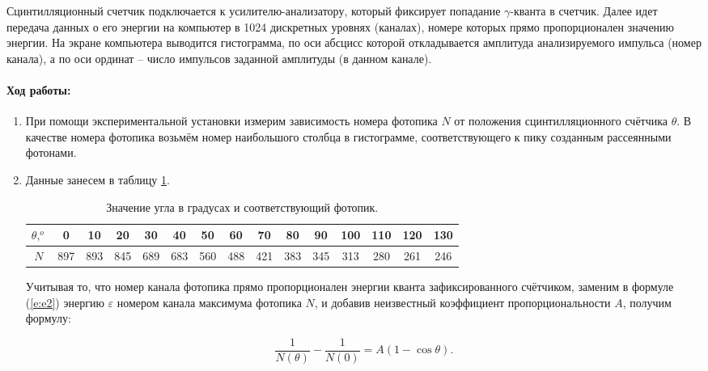 \documentclass[a4paper,12pt]{article}
\begin{document}
Сцинтилляционный счетчик подключается к усилителю-анализатору, который фиксирует попадание $\gamma$-кванта в счетчик. Далее идет передача данных о его энергии на компьютер в 1024 дискретных уровнях (каналах), номере которых прямо пропорционален значению энергии. На экране компьютера выводится гистограмма, по оси абсцисс которой откладывается амплитуда анализируемого импульса (номер канала), а по оси ординат -- число импульсов заданной амплитуды (в данном канале).
\paragraph{Ход работы:}
\begin{enumerate}
\itemsep0em
\item  При помощи экспериментальной установки измерим зависимость номера фотопика $N$ от положения сцинтилляционного счётчика $\theta$. В качестве номера фотопика возьмём номер наибольшого столбца в гистограмме, соответствующего к пику созданным рассеянными фотонами.
\item Данные занесем в таблицу \ref{tab:data}.

\begin{table}[h!]
\centering
\begin{tabular}{|c|c|c|c|c|c|c|c|c|c|c|c|c|c|c|}
\hline
$\theta, ^o$ & 0   & 10  & 20  & 30  & 40  & 50  & 60  & 70  & 80  & 90  & 100 & 110 & 120 & 130 \\ \hline
$N$      & 897 & 893 & 845 & 689 & 683 & 560 & 488 & 421 & 383 & 345 & 313 & 280 & 261 & 246 \\ \hline
\end{tabular}
\caption{Значение угла в градусах и соответствующий фотопик.}
\label{tab:data}
\end{table}
Учитывая то, что номер канала фотопика прямо пропорционален энергии кванта зафиксированного счётчиком, заменим в формуле (\ref{e:e2}) энергию $\varepsilon$ номером канала максимума фотопика $N$, и добавив неизвестный коэффициент пропорциональности $A$, получим формулу:

\begin{equation}
\frac{1}{N(\theta)} - \frac{1}{N(0)} = A(1 - \cos{\theta}).
\label{e:e3}
\end{equation}


\end{enumerate}
\end{document}
